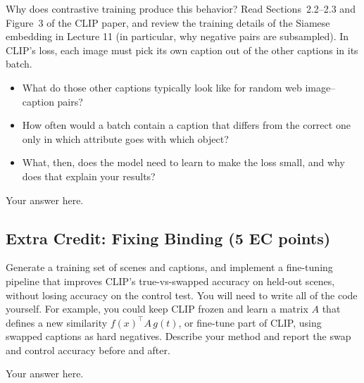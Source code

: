\begin{question}[10]
Why does contrastive training produce this behavior? Read Sections~2.2--2.3 and
Figure~3 of the CLIP paper, and review the training details of the Siamese embedding in
Lecture 11 (in particular, why negative pairs are subsampled). In CLIP's loss, each
image must pick its own caption out of the other captions in its batch.
\begin{itemize}
\item What do those other captions typically look like for random web image--caption
  pairs?
\item How often would a batch contain a caption that differs from the correct one only
  in which attribute goes with which object?
\item What, then, does the model need to learn to make the loss small, and why does that
  explain your results?
\end{itemize}
\end{question}

\begin{solution}
Your answer here.
\end{solution}

\subsection{Extra Credit: Fixing Binding (5 EC points)}

Generate a training set of scenes and captions, and implement a fine-tuning pipeline
that improves CLIP's true-vs-swapped accuracy on held-out scenes, without losing
accuracy on the control test. You will need to write all of the code yourself. For
example, you could keep CLIP frozen and learn a matrix $A$ that defines a new similarity
$f(x)^\top A\, g(t)$, or fine-tune part of CLIP, using swapped captions as hard
negatives. Describe your method and report the swap and control accuracy before and
after.

\begin{ecsolution}
Your answer here.
\end{ecsolution}


